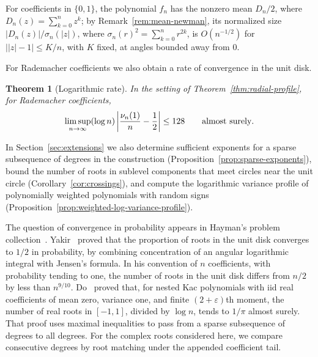 \documentclass[12pt,leqno,twoside]{article}
\newtheorem{theorem}{Theorem}[section]
\theoremstyle{named}
\theoremstyle{remark}
\begin{document}
For coefficients in $\{0,1\}$, the polynomial $f_n$ has the nonzero mean
$D_n/2$, where $D_n(z)=\sum_{k=0}^nz^k$; by Remark~\ref{rem:mean-newman},
its normalized size $|D_n(z)|/\sigma_n(|z|)$, where
$\sigma_n(r)^2=\sum_{k=0}^nr^{2k}$, is $O(n^{-1/2})$ for
$\bigl||z|-1\bigr|\le K/n$, with $K$ fixed, at angles bounded away
from $0$.

For Rademacher coefficients we also obtain a rate of convergence in the
unit disk.

\begin{theorem}[Logarithmic rate]\label{thm:log-rate}
In the setting of Theorem~\ref{thm:radial-profile}, for Rademacher
coefficients,
\[
 \limsup_{n\to\infty}(\log n)
       \left|\frac{\nu_n(1)}n-\frac12\right|
       \le 128\qquad\hbox{almost surely}.
\]
\end{theorem}

In Section~\ref{sec:extensions} we also determine sufficient exponents
for a sparse subsequence of degrees in the construction
(Proposition~\ref{prop:sparse-exponents}), bound the number of roots in
sublevel components that meet circles near the unit circle
(Corollary~\ref{cor:crossings}), and compute the logarithmic variance
profile of polynomially weighted polynomials with random signs
(Proposition~\ref{prop:weighted-log-variance-profile}).

The question of convergence in probability appears in Hayman's problem
collection~\cite[Problem 4.15]{Hayman1967,HaymanLingham2018}.
Yakir~\cite{Yakir2022} proved that the proportion of roots in the unit
disk converges to $1/2$ in probability, by combining concentration of an
angular logarithmic integral with Jensen's formula.
In his convention of $n$ coefficients, with probability tending to one,
the number of roots in the unit disk differs from $n/2$ by less than
$n^{9/10}$.
Do~\cite{Do2024} proved that, for nested Kac polynomials with iid real
coefficients of mean zero, variance one, and finite
$(2+\varepsilon)$th moment, the number of real roots in $[-1,1]$, divided by $\log n$, tends
to $1/\pi$ almost surely.
That proof uses maximal inequalities to pass from a sparse subsequence of
degrees to all degrees.
For the complex roots considered here, we compare
consecutive degrees by root matching under the appended coefficient tail.
\end{document}
